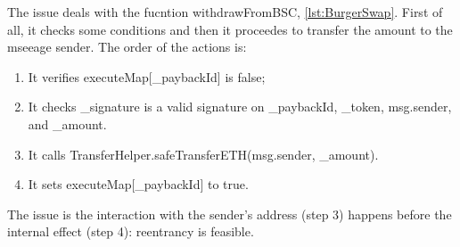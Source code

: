 The issue deals with the fucntion withdrawFromBSC, \autoref{lst:BurgerSwap}. 
First of all, it checks some conditions and then it proceedes to transfer the amount to the mseeage sender. 
The order of the actions is:
\begin{enumerate}
    \item It verifies executeMap[\_paybackId] is false;
    \item It checks \_signature is a valid signature on \_paybackId, \_token, msg.sender, and \_amount.
    \item It calls TransferHelper.safeTransferETH(msg.sender, \_amount).
    \item It sets executeMap[\_paybackId] to true.
\end{enumerate}

The issue is the interaction with the sender's address (step 3) happens before the internal effect (step 4): reentrancy is feasible.

